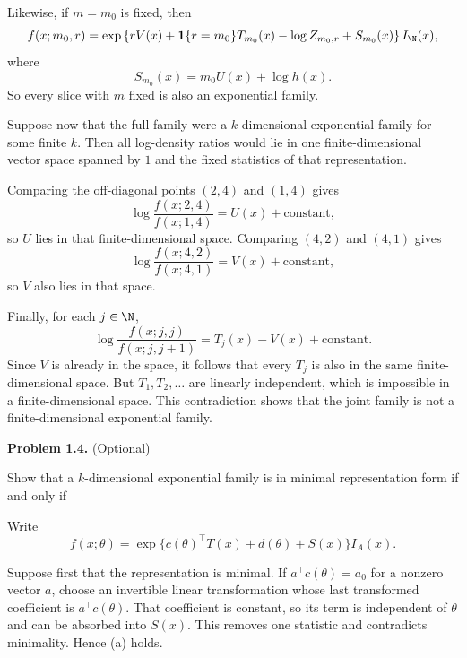\documentclass[answers,12pt,addpoints]{exam}
\begin{document}
\begin{questions}
\begin{solution}
\begin{parts}
Likewise, if $m=m_0$ is fixed, then
\[
f(x;m_0,r)
=
\exp\left\{
 rV(x)+\mathbf 1\{r=m_0\}T_{m_0}(x)
-\log Z_{m_0,r}+S_{m_0}(x)
\right\}I_{\N}(x),
\]
where
\[
S_{m_0}(x)=m_0U(x)+\log h(x).
\]
So every slice with $m$ fixed is also an exponential family.

Suppose now that the full family were a $k$-dimensional exponential family for some
finite $k$. Then all log-density ratios would lie in one finite-dimensional vector
space spanned by $1$ and the fixed statistics of that representation.

Comparing the off-diagonal points $(2,4)$ and $(1,4)$ gives
\[
\log\frac{f(x;2,4)}{f(x;1,4)}=U(x)+\text{constant},
\]
so $U$ lies in that finite-dimensional space. Comparing $(4,2)$ and $(4,1)$ gives
\[
\log\frac{f(x;4,2)}{f(x;4,1)}=V(x)+\text{constant},
\]
so $V$ also lies in that space.

Finally, for each $j\in\N$,
\[
\log\frac{f(x;j,j)}{f(x;j,j+1)}=T_j(x)-V(x)+\text{constant}.
\]
Since $V$ is already in the space, it follows that every $T_j$ is also in the same
finite-dimensional space. But $T_1,T_2,\ldots$ are linearly independent, which is
impossible in a finite-dimensional space. This contradiction shows that the joint
family is not a finite-dimensional exponential family.
\end{parts}
\end{solution}

\question[0] \textbf{Problem 1.4.} (Optional)

Show that a $k$-dimensional exponential family is in minimal representation form if
and only if

\begin{solution}
Write
\[
f(x;\theta)
=
\exp\{c(\theta)^\top T(x)+d(\theta)+S(x)\}I_A(x).
\]

Suppose first that the representation is minimal. If
$a^\top c(\theta)=a_0$ for a nonzero vector $a$, choose an invertible linear
transformation whose last transformed coefficient is $a^\top c(\theta)$. That
coefficient is constant, so its term is independent of $\theta$ and can be absorbed
into $S(x)$. This removes one statistic and contradicts minimality. Hence (a) holds.


\end{solution}
\end{questions}
\end{document}
